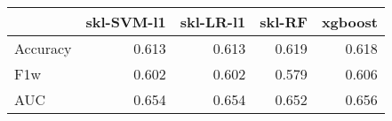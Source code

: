 \begin{tabular}{lrrrr}
\toprule
{} &  skl-SVM-l1 &  skl-LR-l1 &  skl-RF &  xgboost \\
\midrule
Accuracy &       0.613 &      0.613 &   0.619 &    0.618 \\
F1w      &       0.602 &      0.602 &   0.579 &    0.606 \\
AUC      &       0.654 &      0.654 &   0.652 &    0.656 \\
\bottomrule
\end{tabular}
